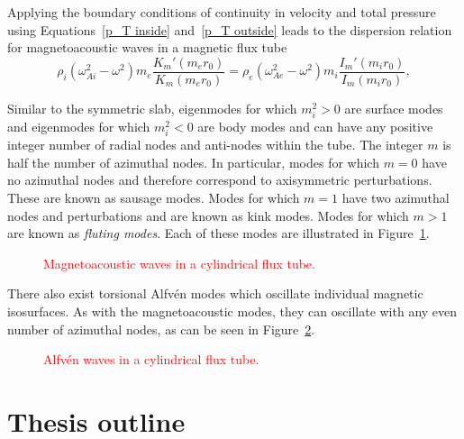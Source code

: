 \documentclass[12pt]{../style-files/ociamthesis}
\begin{document}
Applying the boundary conditions of continuity in velocity and total pressure using Equations~\eqref{p_T inside} and~\eqref{p_T outside} leads to the dispersion relation for magnetoacoustic waves in a magnetic flux tube
\begin{equation}
\rho_i(\omega_{Ai}^2 - \omega^2)m_e\frac{K_m'(m_er_0)}{K_m(m_er_0)} = \rho_e(\omega_{Ae}^2 - \omega^2)m_i\frac{I_m'(m_ir_0)}{I_m(m_ir_0)},
\end{equation}

Similar to the symmetric slab, eigenmodes for which $m_i^2 > 0$ are surface modes and eigenmodes for which $m_i^2 < 0$ are body modes and can have any positive integer number of radial nodes and anti-nodes within the tube. The integer $m$ is half the number of azimuthal nodes. In particular, modes for which $m = 0$ have no azimuthal nodes and therefore correspond to axisymmetric perturbations. These are known as sausage modes. Modes for which $m = 1$ have two azimuthal nodes and perturbations and are known as kink modes. Modes for which $m > 1$ are known as \textit{fluting modes}. Each of these modes are illustrated in Figure~\ref{fig: magnetoacoustic waves flux tube}.
\begin{figure}
	\caption{\textcolor{red}{Magnetoacoustic waves in a cylindrical flux tube.}}
	\label{fig: magnetoacoustic waves flux tube}
\end{figure}

There also exist torsional Alfv\'{e}n modes which oscillate individual magnetic isosurfaces. As with the magnetoacoustic modes, they can oscillate with any even number of azimuthal nodes, as can be seen in Figure~\ref{fig: alvfen modes flux tube}.
\begin{figure}
	\caption{\textcolor{red}{Alfv\'{e}n waves in a cylindrical flux tube.}}
	\label{fig: alvfen modes flux tube}
\end{figure}


\section{Thesis outline}
\label{sec:outline}
\end{document}
